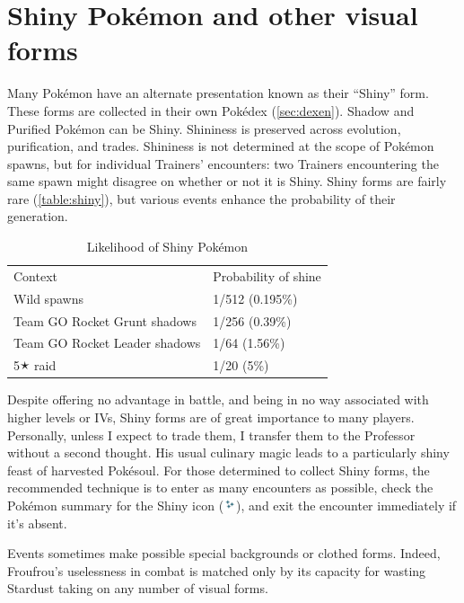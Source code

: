 \section{Shiny Pokémon and other visual forms}
\label{sec:shiny}
Many Pokémon have an alternate presentation known as their ``Shiny'' form.
These forms are collected in their own Pokédex (\autoref{sec:dexen}).
Shadow and Purified Pokémon can be Shiny.
Shininess is preserved across evolution, purification, and trades.
Shininess is not determined at the scope of Pokémon spawns, but for individual
  Trainers' encounters: two Trainers encountering the same spawn might disagree
  on whether or not it is Shiny.
Shiny forms are fairly rare (\autoref{table:shiny}), but various events
  enhance the probability of their generation.
\begin{table}[ht]
\begin{center}
\begin{tabular}{ll}
Context & Probability of shine \\
\Midrule
  Wild spawns & 1/512 (0.195\%) \\
  Team GO Rocket Grunt shadows & 1/256 (0.39\%) \\
  Team GO Rocket Leader shadows & 1/64 (1.56\%) \\
  5🟉 raid & 1/20 (5\%) \\
\end{tabular}
\end{center}
\caption{Likelihood of Shiny Pokémon}
\label{table:shiny}
\end{table}

Despite offering no advantage in battle, and being in no way associated with
  higher levels or IVs, Shiny forms are of great importance to many players.
Personally, unless I expect to trade them, I transfer them to the Professor
  without a second thought.
His usual culinary magic leads to a particularly shiny feast of harvested Pokésoul.
For those determined to collect Shiny forms, the recommended technique
  is to enter as many encounters as possible, check the Pokémon summary
  for the Shiny icon (\includegraphics[width=1em,keepaspectratio]{images/shiny.png}),
  and exit the encounter immediately if it's absent.

Events sometimes make possible special backgrounds or clothed forms.
Indeed, Froufrou's uselessness in combat is matched only by its
  capacity for wasting Stardust taking on any number of visual forms.
